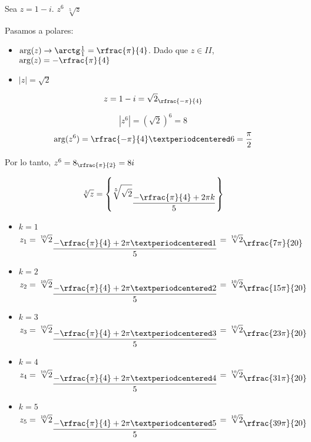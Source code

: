 \documentclass[palatino,nosec,nochap,nobuilddate]{Docencia}
\begin{document}
\begin{problem}

Sea $z=1-i$.
\ppart $z^6$
\ppart $\sqrt[5]{z}$

\solution

Pasamos a polares: 
\begin{itemize}
	\item $\arg(z) \to \arctg\frac{1}{1} = \rfrac{\pi}{4}$. Dado que $z\in II$, $\arg(z) = -\rfrac{\pi}{4}$
	\item $|z| = \sqrt{2}$
\end{itemize}

\[z = 1-i = \sqrt{2}_{\rfrac{-\pi}{4}}\]

\spart

\[|z^6| = \left(\sqrt{2}\right)^6 = 8\]
\[\arg(z^6) = \rfrac{-\pi}{4}·6 = \frac{\pi}{2}\]

Por lo tanto, $z^6 = 8_{\rfrac{\pi}{2}} = 8i$

\spart 
\[\sqrt[5]{z} = \left\{ \sqrt[5]{\sqrt{2}}_{\displaystyle\frac{-\rfrac{\pi}{4}+2\pi k}{5}} \right\}\]
\begin{itemize}
	\item $k=1$
	\[z_1 = \sqrt[10]{2}_{\displaystyle\frac{-\rfrac{\pi}{4}+2\pi ·1}{5}} = \sqrt[10]{2}_{\displaystyle\rfrac{7\pi}{20}}\]
	\item $k=2$
	\[z_2 = \sqrt[10]{2}_{\displaystyle\frac{-\rfrac{\pi}{4}+2\pi ·2}{5}} = \sqrt[10]{2}_{\displaystyle\rfrac{15\pi}{20}}\]
	\item $k=3$
	\[z_3 = \sqrt[10]{2}_{\displaystyle\frac{-\rfrac{\pi}{4}+2\pi ·3}{5}} = \sqrt[10]{2}_{\displaystyle\rfrac{23\pi}{20}}\]
	\item $k=4$
	\[z_4 = \sqrt[10]{2}_{\displaystyle\frac{-\rfrac{\pi}{4}+2\pi ·4}{5}} = \sqrt[10]{2}_{\displaystyle\rfrac{31\pi}{20}}\]
	\item $k=5$
	\[z_5 = \sqrt[10]{2}_{\displaystyle\frac{-\rfrac{\pi}{4}+2\pi ·5}{5}} = \sqrt[10]{2}_{\displaystyle\rfrac{39\pi}{20}}\]
\end{itemize}


\end{problem}
\end{document}
